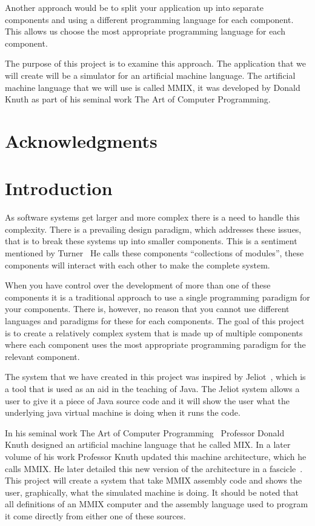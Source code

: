 \documentclass[a4paper,11pt]{report}
\begin{document}
Another approach would be to split your application up into separate components and using a different programming language for each component. This allows us choose the most appropriate programming language for each component.

The purpose of this project is to examine this approach. The application that we will create will be a simulator for an artificial machine language. The artificial machine language that we will use is called MMIX, it was developed by Donald Knuth as part of his seminal work The Art of Computer Programming\cite{knuth:aocp1}.
\newpage
{}
\tableofcontents
\newpage
\listoffigures
\newpage
\chapter*{Acknowledgments}
\chapter{Introduction}
As software systems get larger and more complex there is a need to handle this complexity. There is a prevailing design paradigm, which addresses these issues, that is to break these systems up into smaller components.  This is a sentiment mentioned by Turner~\cite{turner:why}  He calls these components ``collections of modules'', these components will interact with each other to make the complete system. 

When you have control over the development of more than one of these components it is a traditional approach to use a single programming paradigm for your components. There is, however, no reason that you cannot use different languages and paradigms for these for each components. The goal of this project is to create a relatively complex system that is made up of multiple components where each component uses the most appropriate programming paradigm for the relevant component.

The system that we have created in this project was inspired by Jeliot~\cite{jeliot:ref}, which is a tool that is used as an aid in the teaching of Java. The Jeliot system allows a user to give it a piece of Java source code and it will show the user what the underlying java virtual machine is doing when it runs the code.

In his seminal work The Art of Computer Programming~\cite{knuth:aocp1} Professor Donald Knuth designed an artificial machine language that he called MIX. In a later volume of his work Professor Knuth updated this machine architecture, which he calls MMIX. He later detailed this new version of the architecture in a fascicle~\cite{knuth:aocp2}. This project will create a system that take MMIX assembly code and shows the user, graphically, what the simulated machine is doing. It should be noted that all definitions of an MMIX computer and the assembly language used to program it come directly from either one of these sources.
\end{document}

